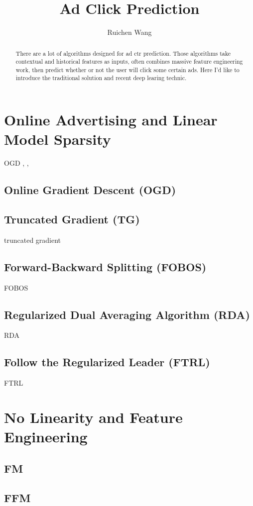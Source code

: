 \documentclass{article}
\author{Ruichen Wang}
\title{Ad Click Prediction}
\begin{document}
\maketitle
\begin{abstract}
There are a lot of algorithms designed for ad ctr prediction. Those algorithms take contextual and historical features as inputs, often combines massive feature engineering work, then predict whether or not the user will click some certain ads. Here I'd like to introduce the traditional solution and recent deep learing technic.
\end{abstract}

\tableofcontents
\section{Online Advertising and Linear Model Sparsity}
OGD , , 
\subsection{Online Gradient Descent (OGD)}
\subsection{Truncated Gradient (TG)}
truncated gradient\cite{DBLP:journals/jmlr/DuchiHS11}
\subsection{Forward-Backward Splitting (FOBOS)}
FOBOS\cite{DBLP:journals/jmlr/DuchiS09}
\subsection{Regularized Dual Averaging Algorithm (RDA)}
RDA\cite{DBLP:journals/jmlr/Xiao10}
\subsection{Follow the Regularized Leader (FTRL)}
FTRL \cite{DBLP:journals/corr/abs-1009-3240}
\section{No Linearity and Feature Engineering}
\subsection{FM}
\subsection{FFM}
\end{document}
